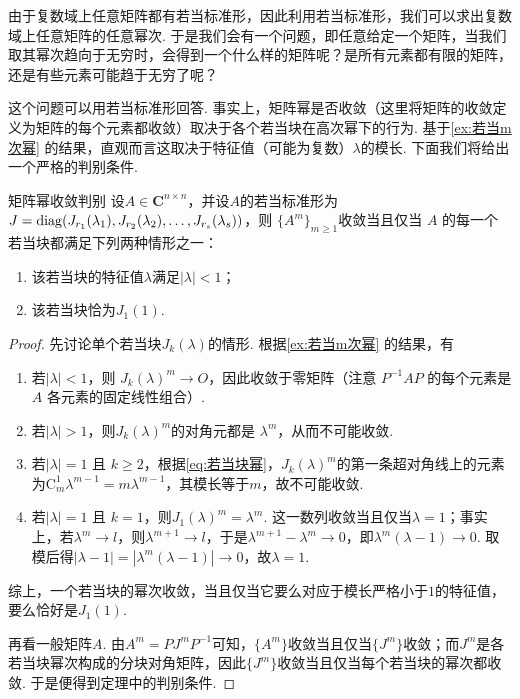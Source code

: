 由于复数域上任意矩阵都有若当标准形，因此利用若当标准形，我们可以求出复数域上任意矩阵的任意幂次. 于是我们会有一个问题，即任意给定一个矩阵，当我们取其幂次趋向于无穷时，会得到一个什么样的矩阵呢？是所有元素都有限的矩阵，还是有些元素可能趋于无穷了呢？

这个问题可以用若当标准形回答. 事实上，矩阵幂是否收敛（这里将矩阵的收敛定义为矩阵的每个元素都收敛）取决于各个若当块在高次幂下的行为. 基于\autoref{ex:若当m次幂} 的结果，直观而言这取决于特征值（可能为复数）$\lambda$的模长. 下面我们将给出一个严格的判别条件.

\begin{theorem}{}{矩阵幂收敛判别}
    设$A\in\mathbf{C}^{n\times n}$，并设$A$的若当标准形为 $J=\operatorname{diag}(J_{r_1}(\lambda_1),J_{r_2}(\lambda_2),\ldots,J_{r_s}(\lambda_s))$，则 $\{A^m\}_{m\geqslant 1}$收敛当且仅当 $A$ 的每一个若当块都满足下列两种情形之一：
    \begin{enumerate}
        \item 该若当块的特征值$\lambda$满足$|\lambda|<1$；
        \item 该若当块恰为$J_1(1)$.
    \end{enumerate}
\end{theorem}

\begin{proof}
    先讨论单个若当块$J_k(\lambda)$的情形. 根据\autoref{ex:若当m次幂} 的结果，有
    \begin{enumerate}
        \item 若$|\lambda|<1$，则 $J_k(\lambda)^m\to O$，因此收敛于零矩阵（注意 $P^{-1}AP$ 的每个元素是 $A$ 各元素的固定线性组合）.

        \item 若$|\lambda|>1$，则$J_k(\lambda)^m$的对角元都是 $\lambda^m$，从而不可能收敛.

        \item 若$|\lambda|=1$ 且 $k\geqslant 2$，根据\autoref{eq:若当块幂}，$J_k(\lambda)^m$的第一条超对角线上的元素为$\mathrm{C}_m^1\lambda^{m-1}=m\lambda^{m-1}$，其模长等于$m$，故不可能收敛.

        \item 若$|\lambda|=1$ 且 $k=1$，则$J_1(\lambda)^m=\lambda^m$. 这一数列收敛当且仅当$\lambda=1$；事实上，若$\lambda^m\to l$，则$\lambda^{m+1}\to l$，于是$\lambda^{m+1}-\lambda^m\to 0$，即$\lambda^m(\lambda-1)\to 0$. 取模后得$|\lambda-1|=|\lambda^m(\lambda-1)|\to 0$，故$\lambda=1$.
    \end{enumerate}

    综上，一个若当块的幂次收敛，当且仅当它要么对应于模长严格小于$1$的特征值，要么恰好是$J_1(1)$.

    再看一般矩阵$A$. 由$A^m=PJ^mP^{-1}$可知，$\{A^m\}$收敛当且仅当$\{J^m\}$收敛；而$J^m$是各若当块幂次构成的分块对角矩阵，因此$\{J^m\}$收敛当且仅当每个若当块的幂次都收敛. 于是便得到定理中的判别条件.
\end{proof}

